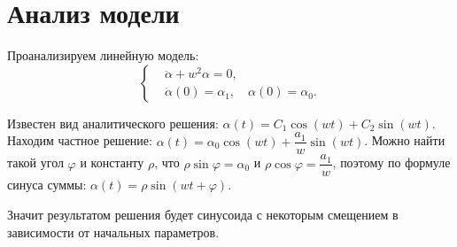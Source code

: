\section{Анализ модели}
    Проанализируем линейную модель:
    \[
        \begin{cases}
            & \ddot{\alpha} + w^2 \alpha = 0, \\
            & \dot{\alpha}(0) = \alpha_1, \quad \alpha(0) = \alpha_0.
        \end{cases}
    \]

    Известен вид аналитического решения: \( \alpha(t) = C_1 \cos(wt) + C_2 \sin(wt) \). Находим частное решение: \( \alpha(t) = \alpha_0 \cos(wt) + \dfrac{a_1}{w} \sin(wt) \). Можно найти такой угол $\varphi$ и константу $\rho$, что \( \rho\sin \varphi = \alpha_0 \) и \( \rho\cos \varphi = \dfrac{a_1}{w} \), поэтому по формуле синуса суммы: \( \alpha(t) = \rho\sin(wt + \varphi) \).

    Значит результатом решения будет синусоида с некоторым смещением в зависимости от начальных параметров.